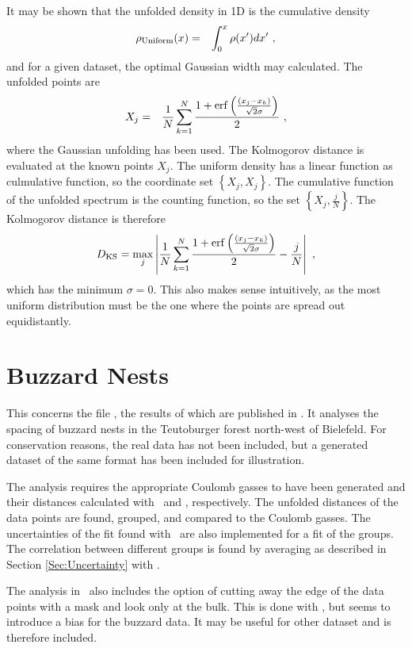 \documentclass[a4paper,11pt]{article}
\numberwithin{equation}{section}
\begin{document}
It may be shown that the unfolded density in 1D is the cumulative density
\begin{eqnarray}
\rho_{\rm Uniform}(x) &=& \int_{0}^{x}\rho(x')dx'\ ,
\end{eqnarray}
and for a given dataset, the optimal Gaussian width may calculated. The unfolded points are
\begin{eqnarray}
X_j &=& \frac{1}{N}\sum_{k=1}^{N}\frac{1+\erf\left(\frac{(x_j-x_k)}{\sqrt{2}\sigma}\right)}{2}\ ,
\end{eqnarray}
where the Gaussian unfolding has been used.
The Kolmogorov distance is evaluated at the known points $X_j$. The uniform density has a linear function as culmulative function, so the coordinate set $\left\{X_j,X_j\right\}$. The cumulative function of the unfolded spectrum is the counting function, so the set $\left\{X_j,\frac{j}{N}\right\}$. The Kolmogorov distance is therefore
\begin{eqnarray}
D_{\rm KS} = \max_j \left|\frac{1}{N}\sum_{k=1}^{N}\frac{1+{\rm erf}\left(\frac{(x_j-x_k)}{\sqrt{2}\sigma}\right)}{2} - \frac{j}{N}\right|\ ,
\end{eqnarray}
which has the minimum $\sigma=0$.
This also makes sense intuitively, as the most uniform distribution must be the one where the points are spread out equidistantly.

\section{Buzzard Nests}\label{Sec:ConEx}
This concerns the file \fileBuzzardRead, the results of which are published in \cite{Buzzard}. It analyses the spacing of buzzard nests in the Teutoburger forest north-west of Bielefeld. For conservation reasons, the real data has not been included, but a generated dataset of the same format has been included for illustration.

The analysis requires the appropriate Coulomb gasses to have been generated and their distances calculated with \fileCoulombGenerate\ and \fileCoulombDistCalc, respectively. The unfolded distances of the data points are found, grouped, and compared to the Coulomb gasses. The uncertainties of the fit found with \fileBetaUncertainty\ are also implemented for a fit of the groups. The correlation between different groups is found by averaging as described in Section \ref{Sec:Uncertainty} with \fileCovCon.

The analysis in \fileBuzzardRead\ also includes the option of cutting away the edge of the data points with a mask and look only at the bulk. This is done with \fileCutOutBuzz, but seems to introduce a bias for the buzzard data. It may be useful for other dataset and is therefore included.
\end{document}

